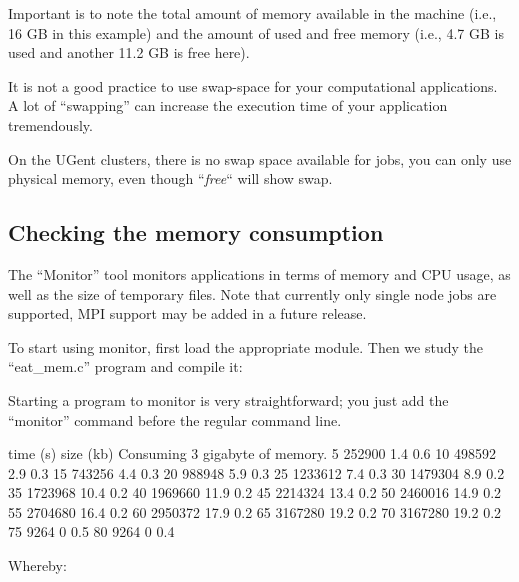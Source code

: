 Important is to note the total amount of memory available in the machine (i.e.,
16 GB in this example) and the amount of used and free memory (i.e., 4.7 GB is
used and another 11.2 GB is free here).

It is not a good practice to use swap-space for your computational
applications. A lot of ``swapping'' can increase the execution time of your
application tremendously.

\ifgent
  On the UGent clusters, there is no swap space available for jobs, you
  can only use physical memory, even though ``\emph{free}`` will show
  swap.
\fi

\subsection{Checking the memory consumption}

\ifgent
\else
The ``Monitor'' tool monitors applications in terms of memory and CPU usage, as
well as the size of temporary files. Note that currently only single node jobs
are supported, MPI support may be added in a future release.

To start using monitor, first load the appropriate module. Then we study the
``eat\_mem.c'' program and compile it:

\begin{prompt}
\end{prompt}


Starting a program to monitor is very straightforward; you just add the
``monitor'' command before the regular command line.

\begin{prompt}
time (s) size (kb) %
Consuming 3 gigabyte of memory.
5  252900 1.4 0.6
10  498592 2.9 0.3
15  743256 4.4 0.3
20  988948 5.9 0.3
25  1233612 7.4 0.3
30  1479304 8.9 0.2
35  1723968 10.4 0.2
40  1969660 11.9 0.2
45  2214324 13.4 0.2
50  2460016 14.9 0.2
55  2704680 16.4 0.2
60  2950372 17.9 0.2
65  3167280 19.2 0.2
70  3167280 19.2 0.2
75  9264  0 0.5
80  9264  0 0.4
\end{prompt}

Whereby:

